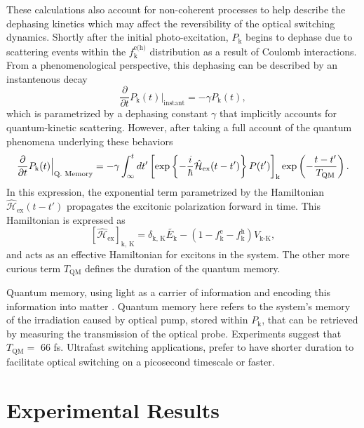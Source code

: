These calculations also account for non-coherent processes to help describe the dephasing kinetics which may affect the reversibility of the optical switching dynamics. Shortly after the initial photo-excitation, $P_\text{k}$ begins to dephase due to scattering events within the $f_\text{k}^\text{e(h)}$ distribution as a result of Coulomb interactions. From a phenomenological perspective, this dephasing can be described by an instantenous decay
\begin{equation}
	\dfrac{\partial}{\partial t} P_\text{k}(t) \Big|_\text{instant} = -\gamma P_\text{k}(t),
\end{equation}
which is parametrized by a dephasing constant $\gamma$ that implicitly accounts for quantum-kinetic scattering. However, after taking a full account of the quantum phenomena underlying these behaviors
%
\begin{equation}\label{eq:kira_phenom_dephase}
	\dfrac{\partial}{\partial t} P_\text{k}(t) \Big|_\text{Q. Memory} = -\gamma \int^{t}_{\infty} dt' \left[ \exp\left\{ - \frac{\small i}{ \small \hbar} \hat{\mathcal{H}}_\text{ex}(t-t') \right\} P(t') \right]_\text{k} \exp \left(- \frac{t-t'}{T_\text{QM}} \right).
\end{equation}
%
In this expression, the exponential term parametrized by the Hamiltonian $\hat{\mathcal{H}}_\text{ex}(t-t')$ propagates the excitonic polarization forward in time. This Hamiltonian is expressed as
\begin{equation}\label{eq:kira_quantum_dephase}
	\left[ \hat{\mathcal{H}}_\text{ex} \right]_\text{k, K}= \delta_\text{k, K} \tilde{E_\text{k}} - (1 - f_\text{k}^\text{e} - f_\text{k}^\text{h}) V_\text{k-K},
\end{equation}
%
and acts as an effective Hamiltonian for excitons in the system. The other more curious term $T_\text{QM}$ defines the duration of the quantum memory.

Quantum memory, using light as a carrier of information and encoding this information into matter \cite{iakoupov2013efficient}. Quantum memory here refers to the system's memory of the irradiation caused by optical pump, stored within $P_\text{k}$, that can be retrieved by measuring the transmission of the optical probe. Experiments suggest that $T_\text{QM} = $ 66 fs. Ultrafast switching applications, prefer to have shorter duration to facilitate optical switching on a picosecond timescale or faster.
\section{Experimental Results}

